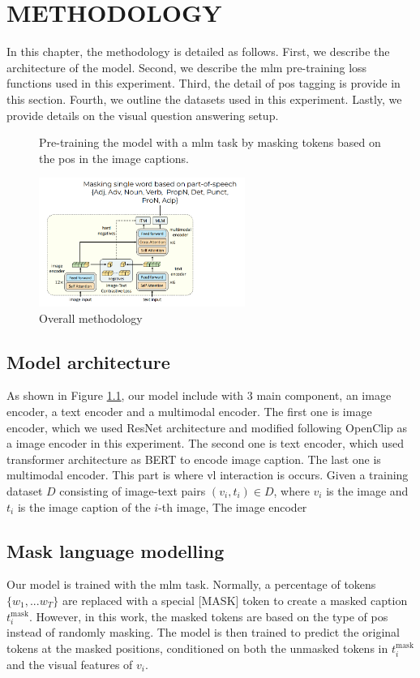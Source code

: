 \chapter{METHODOLOGY}
In this chapter, the methodology is detailed as follows. 
First, we describe the architecture of the model. 
Second, we describe the \acrshort{mlm} pre-training loss functions used in this experiment.
Third, the detail of \acrshort{pos} tagging is provide in this section.
Fourth, we outline the datasets used in this experiment. 
Lastly, we provide details on the visual question answering setup.

\begin{figure}[h]
    \caption{Overall methodology}
    \label{fig:overview}
    Pre-training the model with a \acrshort{mlm} task by masking tokens based on the \acrshort{pos} in the image captions.
    \begin{center}
        \includegraphics[width=0.6\textwidth]{Images/overview.png}
    \end{center}
    \small
\end{figure}

\section{Model architecture}
As shown in Figure \ref{fig:overview}, our model include with 3 main component, an image encoder, a text encoder and a multimodal encoder. 
The first one is image encoder, which we used ResNet \cite{resnet} architecture and modified following OpenClip as a image encoder in this experiment.
The second one is text encoder, which used transformer architecture as BERT \cite{bert} to encode image caption.
The last one is multimodal encoder.
This part is where \acrshort{vl} interaction is occurs.
Given a training dataset \(D\) consisting of image-text pairs \((v_i, t_i) \in D\), where \(v_i\) is the image and \(t_i\) is the image caption of the \(i\)-th image, 
The image encoder


\section{Mask language modelling}
Our model is trained with the \acrshort{mlm} task.
Normally, a percentage of tokens \(\{w_1,...w_T\}\) are replaced with a special [MASK] token to create a masked caption \(t_i^{\text{mask}}\).
However, in this work, the masked tokens are based on the type of \acrshort{pos} instead of randomly masking.
The model is then trained to predict the original tokens at the masked positions, conditioned on both the unmasked tokens in \(t_i^{\text{mask}}\) and the visual features of \(v_i\). 

